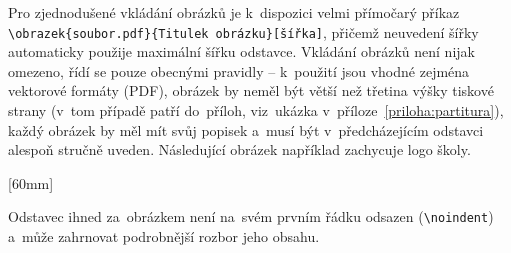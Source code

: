 Pro zjednodušené vkládání obrázků je k~dispozici velmi přímočarý příkaz
\texttt{{\textbackslash}obrazek\{soubor.pdf\}\{Titulek obrázku\}[šířka]},
přičemž neuvedení šířky automaticky použije maximální šířku odstavce.
Vkládání obrázků není nijak omezeno, řídí se pouze obecnými pravidly --
k~použití jsou vhodné zejména vektorové formáty (PDF), obrázek by neměl být
větší než třetina výšky tiskové strany (v~tom případě patří do~příloh,
viz~ukázka v~příloze~\ref{priloha:partitura}), každý obrázek by měl mít svůj
popisek a~musí být v~předcházejícím odstavci alespoň stručně uveden. Následující
obrázek například zachycuje logo školy.

[60mm]

\noindent
Odstavec ihned za~obrázkem není na~svém prvním řádku odsazen
(\texttt{{\textbackslash}noindent}) a~může zahrnovat podrobnější rozbor jeho
obsahu.
